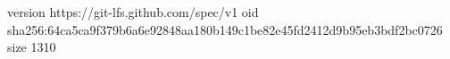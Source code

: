 version https://git-lfs.github.com/spec/v1
oid sha256:64ca5ca9f379b6a6e92848aa180b149c1be82e45fd2412d9b95eb3bdf2bc0726
size 1310
